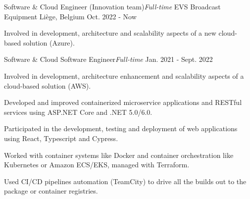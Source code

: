 
\begin{cventries}

  \cventry
    {Software \& Cloud Engineer (Innovation team){\enskip\cdotp\enskip}\it{Full-time}} %
    {EVS Broadcast Equipment} %
    {Liège, Belgium} %
    {Oct. 2022 - Now} %
    {
      \begin{cvitems} %
        \item{Involved in development, architecture and scalability aspects of a new cloud-based solution (Azure).}
      \end{cvitems}
    }

  \cventry
    {Software \& Cloud Software Engineer{\enskip\cdotp\enskip}\it{Full-time}} %
    {} %
    {} %
    {Jan. 2021 - Sept. 2022} %
    {
      \begin{cvitems} %
        \item{Involved in development, architecture enhancement and scalability aspects of a cloud-based solution (AWS).}
        \item{Developed and improved containerized microservice applications and RESTful services using ASP.NET Core and .NET 5.0/6.0.}
        \item{Participated in the development, testing and deployment of web applications using React, Typescript and Cypress.}
        \item{Worked with container systems like Docker and container orchestration like Kubernetes or Amazon ECS/EKS, managed with Terraform.}
        \item{Used CI/CD pipelines automation (TeamCity) to drive all the builds out to the package or container registries.}
      \end{cvitems}
    }


\end{cventries}
